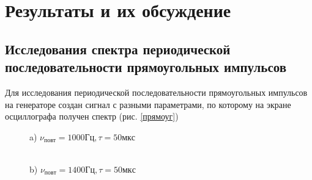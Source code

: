 \documentclass[a4paper,12pt]{article} %
\begin{document}
\section{Результаты и их обсуждение}
\subsection*{Исследования спектра периодической последовательности прямоугольных импульсов}
Для исследования периодической последовательности прямоугольных импульсов на генераторе создан сигнал с разными параметрами, по которому на экране осциллографа получен спектр (рис. \ref{прямоуг})

\begin{figure}[h!]
\begin{minipage}[h!]{0.47\linewidth}
 a) $\nu_{повт} = 1000 Гц, \tau = 50 мкс$\\
\end{minipage}
\hfill
\begin{minipage}[h!]{0.47\linewidth}
 \\b) $\nu_{повт} = 1400 Гц, \tau = 50 мкс$
\end{minipage}
\end{figure}
\end{document}
